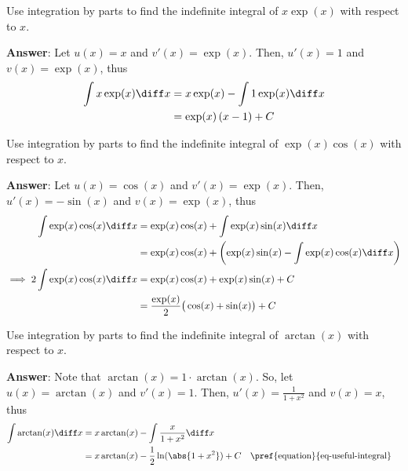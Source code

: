 \begin{exm}\label{exm-integration-by-parts:1}
	Use integration by parts to find the indefinite integral of $x\exp(x)$ with respect to $x$.
	\begin{flushleft}
		\textbf{Answer}: Let $u(x)=x$ and $v'(x)=\exp(x)$. Then,
		$u'(x)=1$ and $v(x)=\exp(x)$, thus
		\begin{align*}
			\int x\exp(x) \diff x & = x\exp(x) - \int 1\exp(x) \diff x \\
			                      & = \exp(x)\left(x-1\right) + C
		\end{align*}
	\end{flushleft}
\end{exm}

\begin{exm}\label{exm-integration-by-parts:2}
	Use integration by parts to find the indefinite integral of $\exp(x)\cos(x)$ with respect to $x$.
	\begin{flushleft}
		\textbf{Answer}: Let $u(x)=\cos(x)$ and $v'(x)=\exp(x)$. Then,
		$u'(x)=-\sin(x)$ and $v(x)=\exp(x)$, thus
		\begin{align*}
			\int \exp(x)\cos(x) \diff x           & = \exp(x)\cos(x) + \int \exp(x)\sin(x) \diff x                               \\
			                                      & = \exp(x)\cos(x) + \left(\exp(x)\sin(x) - \int \exp(x)\cos(x) \diff x\right) \\
			\implies 2\int \exp(x)\cos(x) \diff x & = \exp(x)\cos(x) + \exp(x)\sin(x) + C                                        \\
			                                      & = \frac{\exp(x)}{2}\big(\cos(x)+\sin(x)\big) + C
		\end{align*}
	\end{flushleft}
\end{exm}

\begin{exm}\label{exm-integration-by-parts:3}
	Use integration by parts to find the indefinite integral of $\arctan(x)$ with respect to $x$.
	\begin{flushleft}
		\textbf{Answer}: Note that $\arctan(x)=1\cdot\arctan(x)$. So, let
		$u(x)=\arctan(x)$ and $v'(x)=1$. Then, $u'(x)=\frac{1}{1+x^2}$ and $v(x)=x$, thus
		\begin{align*}
			\int \arctan(x) \diff x & = x\arctan(x) - \int \frac{x}{1+x^2} \diff x                                                    \\
			                        & = x\arctan(x) - \frac{1}{2}\ln(\abs{1+x^2}) + C &  & \text{\pref{equation}{eq-useful-integral}}
		\end{align*}
	\end{flushleft}
\end{exm}


